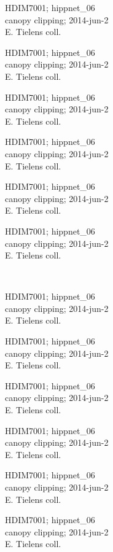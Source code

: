 \documentclass[2pt]{extarticle}
\begin{document}
\noindent
\parbox{0.16\textwidth}{\tiny \raggedright \rule[-0.3\baselineskip]{0pt}{10pt}HDIM7001; hippnet\_06\\ canopy clipping; 2014-jun-2\\ E. Tielens coll.}
\parbox{0.16\textwidth}{\tiny \raggedright \rule[-0.3\baselineskip]{0pt}{10pt}HDIM7001; hippnet\_06\\ canopy clipping; 2014-jun-2\\ E. Tielens coll.}
\parbox{0.16\textwidth}{\tiny \raggedright \rule[-0.3\baselineskip]{0pt}{10pt}HDIM7001; hippnet\_06\\ canopy clipping; 2014-jun-2\\ E. Tielens coll.}
\parbox{0.16\textwidth}{\tiny \raggedright \rule[-0.3\baselineskip]{0pt}{10pt}HDIM7001; hippnet\_06\\ canopy clipping; 2014-jun-2\\ E. Tielens coll.}
\parbox{0.16\textwidth}{\tiny \raggedright \rule[-0.3\baselineskip]{0pt}{10pt}HDIM7001; hippnet\_06\\ canopy clipping; 2014-jun-2\\ E. Tielens coll.}
\parbox{0.16\textwidth}{\tiny \raggedright \rule[-0.3\baselineskip]{0pt}{10pt}HDIM7001; hippnet\_06\\ canopy clipping; 2014-jun-2\\ E. Tielens coll.} \\ 
\vspace{0.001in} 

\noindent
\parbox{0.16\textwidth}{\tiny \raggedright \rule[-0.3\baselineskip]{0pt}{10pt}HDIM7001; hippnet\_06\\ canopy clipping; 2014-jun-2\\ E. Tielens coll.}
\parbox{0.16\textwidth}{\tiny \raggedright \rule[-0.3\baselineskip]{0pt}{10pt}HDIM7001; hippnet\_06\\ canopy clipping; 2014-jun-2\\ E. Tielens coll.}
\parbox{0.16\textwidth}{\tiny \raggedright \rule[-0.3\baselineskip]{0pt}{10pt}HDIM7001; hippnet\_06\\ canopy clipping; 2014-jun-2\\ E. Tielens coll.}
\parbox{0.16\textwidth}{\tiny \raggedright \rule[-0.3\baselineskip]{0pt}{10pt}HDIM7001; hippnet\_06\\ canopy clipping; 2014-jun-2\\ E. Tielens coll.}
\parbox{0.16\textwidth}{\tiny \raggedright \rule[-0.3\baselineskip]{0pt}{10pt}HDIM7001; hippnet\_06\\ canopy clipping; 2014-jun-2\\ E. Tielens coll.}
\parbox{0.16\textwidth}{\tiny \raggedright \rule[-0.3\baselineskip]{0pt}{10pt}HDIM7001; hippnet\_06\\ canopy clipping; 2014-jun-2\\ E. Tielens coll.} \\ 
\vspace{0.001in} 
\end{document}
